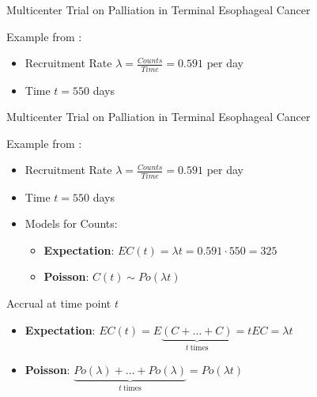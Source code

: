 \documentclass[english]{beamer}\usepackage[]{graphicx}\usepackage[]{xcolor}
\begin{document}
\begin{frame}{Multicenter Trial on Palliation in Terminal Esophageal Cancer}

Example from \cite{carter2004application}:
\begin{itemize}
\item Recruitment Rate $\lambda = \frac{Counts}{Time} = 0.591$ per day
\item Time $t = 550$ days
\end{itemize}

\end{frame}


\begin{frame}{Multicenter Trial on Palliation in Terminal Esophageal Cancer}

Example from \cite{carter2004application}:
\begin{itemize}
\item Recruitment Rate $\lambda = \frac{Counts}{Time} = 0.591$ per day
\item Time $t = 550$ days
\item Models for Counts:
	\begin{itemize}
	\item \textbf{Expectation}: $EC(t) = \lambda t = 0.591 \cdot 550 = 325$
	\item \textbf{Poisson}: $C(t) \sim Po(\lambda t)$
	\end{itemize}
\end{itemize}

\end{frame}




\begin{frame}{Accrual at time point $t$}
\begin{itemize}
\item \textbf{Expectation}: $EC(t) = E\underbrace{(C +\ldots + C)}_{t \ \text{times}} = t E C = \lambda t$
\item \textbf{Poisson}: $\underbrace{Po (\lambda) +\ldots +Po (\lambda)}_{t \ \text{times}} = Po (\lambda t)$
\end{itemize}
\end{frame}
\end{document}
